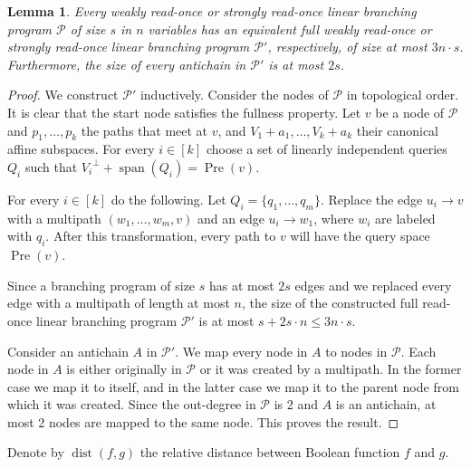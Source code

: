 \documentclass[a4paper,11pt,draft]{article}
\newtheorem{lemma}[theorem]{Lemma}
\theoremstyle{definition}
\theoremstyle{remark}
\DeclareMathOperator{\dist}{dist}
\DeclareMathOperator{\Span}{span}
\DeclareMathOperator{\pre}{Pre}
\newcommand{\orth}[1]{{#1}^{\perp}}
\newcommand{\calP}{\mathcal{P}}
\newcommand{\sreadonce}{strongly read-once}
\newcommand{\wreadonce}{weakly read-once}
\newcommand{\readonce}{read-once}
\begin{document}
\begin{lemma}\label{lem:full_bp}
  Every \wreadonce{} or \sreadonce{} linear branching program $\calP$ of size $s$ in $n$ variables has an equivalent full \wreadonce{} or \sreadonce{} linear branching program $\calP'$, respectively, of size at most $3n \cdot s$. Furthermore, the size of every antichain in $\calP'$ is at most $2s$.
\end{lemma}
\begin{proof}
  We construct $\calP'$ inductively. Consider the nodes of $\calP$ in topological order. It is clear that the start node satisfies the fullness property. Let $v$ be a node of $\calP$ and $p_1, \ldots, p_k$ the paths that meet at $v$, and $V_1 + a_1, \ldots, V_k + a_k$ their canonical affine subspaces. 
  For every $i \in [k]$ choose a set of linearly independent queries $Q_i$ such that $\orth{V_i} + \Span(Q_i) = \pre(v)$.

  For every $i \in [k]$ do the following. Let $Q_i = \{q_1, \ldots, q_m\}$. Replace the edge $u_i \to v$ with a multipath $(w_1, \ldots, w_m, v)$ and an edge $u_i \to w_1$, where $w_i$ are labeled with $q_i$. After this transformation, every path to $v$ will have the query space $\pre(v)$.

  Since a branching program of size $s$ has at most $2s$ edges and we replaced every edge with a multipath of length at most $n$, the size of the constructed full \readonce{} linear branching program $\calP'$ is at most $s+2s \cdot n \le 3n \cdot s$.

  Consider an antichain $A$ in $\calP'$. We map every node in $A$ to nodes in $\calP$. Each node in $A$ is either originally in $\calP$ or it was created by a multipath. In the former case we map it to itself, and in the latter case we map it to the parent node from which it was created. Since the out-degree in $\calP$ is 2 and $A$ is an antichain, at most 2 nodes are mapped to the same node. This proves the result.
\end{proof}

Denote by $\dist(f,g)$ the relative distance between Boolean function $f$ and $g$.
\end{document}
